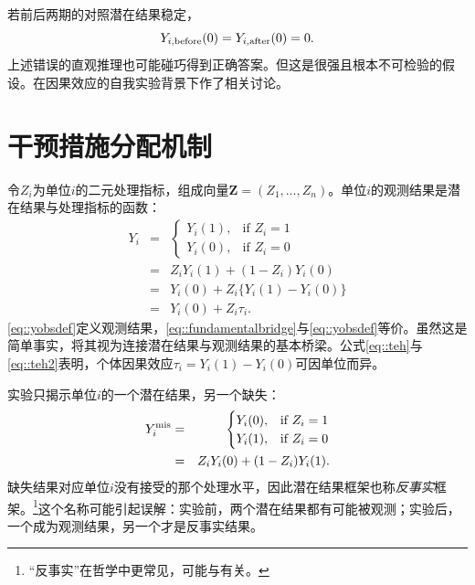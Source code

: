 若前后两期的对照潜在结果稳定，
$$
Y_{i,\textup{before}}(0) = Y_{i,\textup{after}}(0) = 0 .
$$
上述错误的直观推理也可能碰巧得到正确答案。但这是很强且根本不可检验的假设。\citet{rubin2001comment}在因果效应的自我实验背景下作了相关讨论。



\section{干预措施分配机制}\label{sec::Treatment-ScienceTable}

令$Z_i$为单位$i$的二元处理指标，组成向量$\bm{Z} = (Z_1, \ldots, Z_n)$。单位$i$的观测结果是潜在结果与处理指标的函数：
\begin{eqnarray} 
Y_i &=& \begin{cases}
   Y_i(1),& \text{if } Z_i = 1\\
   Y_i(0), & \text{if } Z_i = 0
\end{cases} \label{eq::yobsdef} \\
&=& Z_i Y_i(1) + (1-Z_i)Y_i(0) \label{eq::fundamentalbridge} \\
&=& Y_i(0)  + Z_i\{  Y_i(1) - Y_i(0)  \} \label{eq::teh} \\
&=&Y_i(0)  + Z_i\tau_i . \label{eq::teh2} 
\end{eqnarray}
\eqref{eq::yobsdef}定义观测结果，\eqref{eq::fundamentalbridge}与\eqref{eq::yobsdef}等价。虽然这是简单事实，\citet{pearl2010brief}将其视为连接潜在结果与观测结果的基本桥梁。公式\eqref{eq::teh}与\eqref{eq::teh2}表明，个体因果效应$\tau_i =  Y_i(1) - Y_i(0)  $可因单位而异。 


实验只揭示单位$i$的一个潜在结果，另一个缺失：
\begin{eqnarray*} 
Y_i^\textup{mis} &=& \begin{cases}
   Y_i(0),& \text{if } Z_i = 1\\
   Y_i(1), & \text{if } Z_i = 0
\end{cases}  \\
&=& Z_i Y_i(0) + (1-Z_i)Y_i(1) .
\end{eqnarray*}
缺失结果对应单位$i$没有接受的那个处理水平，因此潜在结果框架也称{\it 反事实}框架。\footnote{“反事实”在哲学中更常见，可能与\citet{lewis1973causation}有关。}这个名称可能引起误解：实验前，两个潜在结果都有可能被观测；实验后，一个成为观测结果，另一个才是反事实结果。 


